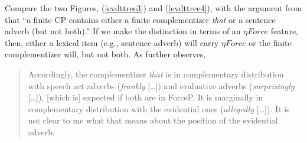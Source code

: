 \documentclass{article}
\begin{document}
% 

Compare the two Figures, (\ref{evdttree3}) and (\ref{evdttree4}), with the argument from  that ``a finite CP contains either a finite complementizer {\sl that} or a sentence adverb (but not both).'' If we make the distinction in terms of an $\eta Force$ feature, then, either a lexical item (e.g., sentence adverb) will carry $\eta Force$ or the finite complementizer will, but not both. As  further observes, 

\begin{quote}
Accordingly, the complementizer {\sl that} is in complementary distribution with speech act adverbs ({\sl frankly} [\ldots]) and evaluative adverbs ({\sl surprisingly} [\ldots]), [which is] expected if both are in ForceP. It is marginally in complementary distribution with the evidential ones ({\sl allegedly} [\ldots]). It is not clear to me what that means about the position of the evidential adverb.
\end{quote}
\end{document}
